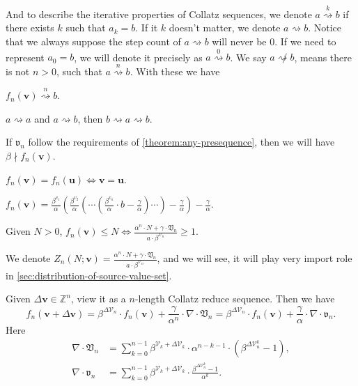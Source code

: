 And to describe the iterative properties of Collatz sequences, we denote $a \overset{k}{\rightsquigarrow} b$ if there exists $k$ such that $a_k = b$.
If it $k$ doesn't matter, we denote $a \rightsquigarrow b$. Notice that we always suppose the step count of $a \rightsquigarrow b$ will never be $0$. If we need to represent $a_0 = b$, we will denote it precisely as $a \overset{0}{\rightsquigarrow} b$. We say $a \not\rightsquigarrow b$, means there is not $n > 0$, such that $a \overset{n}{\rightsquigarrow} b$.
With these we have
\begin{proposition}
    $f_{n}(\bm{v}) \overset{n}{\rightsquigarrow} b$.
\end{proposition}
\begin{proposition}
    $a\rightsquigarrow a$ and $a \rightsquigarrow b$, then $b \rightsquigarrow a \rightsquigarrow b$.
\end{proposition}
\begin{proposition}
    If $\mathfrak{v}_{n}$ follow the requirements of \cref{theorem:any-presequence}, then we will have $\beta \nmid f_{n}(\bm{v})$.
\end{proposition}
\begin{proposition}
    $f_{n}(\bm{v}) = f_{n}(\bm{u}) \Longleftrightarrow \bm{v} = \bm{u}$.
\end{proposition}
\begin{proposition}
    $f_{n}(\bm{v}) = \frac{\beta^{v_{1}}}{\alpha}\left(\frac{\beta^{v_{2}}}{\alpha}\left(\cdots \left(\frac{\beta^{v_{n}}}{\alpha}\cdot b - \frac{\gamma}{\alpha}\right)\cdots\right)- \frac{\gamma}{\alpha}\right) - \frac{\gamma}{\alpha}$.
\end{proposition}
\begin{proposition}\label{prop:condition-of-source-value-le-N}
    Given $N > 0$, $f_{n}(\bm{v}) \le N \Longleftrightarrow \frac{\alpha^{n}\cdot N + \gamma\cdot\mathfrak{V}_{n}}{a\cdot \beta^{\mathcal{V}_{n}}} \ge 1$.
\end{proposition}
We denote $Z_{n}(N;\bm{v}) = \frac{\alpha^{n}\cdot N + \gamma\cdot\mathfrak{V}_{n}}{a\cdot \beta^{\mathcal{V}_{n}}}$, and we will see, it will play very import role in \cref{sec:distribution-of-source-value-set}.
\begin{theorem}\label{thm:vary-rule}
Given $\Delta\bm{v} \in \mathbb{Z}^{n}$, view it as a $n$-length Collatz reduce sequence. Then we have
\[ f_{n}(\bm{v} + \Delta\bm{v}) = \beta^{\Delta\mathcal{V}_{n}}\cdot f_{n}(\bm{v}) + \frac{\gamma}{\alpha^{n}} \cdot \nabla\cdot\mathfrak{V}_{n} = \beta^{\Delta\mathcal{V}_{n}}\cdot f_{n}(\bm{v}) + \frac{\gamma}{\alpha} \cdot \nabla\cdot\mathfrak{v}_{n}. \]
Here
\begin{align*}
    \nabla\cdot\mathfrak{V}_{n} &= \sum_{k=0}^{n-1}\beta^{\mathcal{V}_{k} + \Delta\mathcal{V}_{k}}\cdot\alpha^{n-k-1}\cdot(\beta^{\Delta\mathcal{V}_{n}^{k}} - 1),\\
    \nabla\cdot\mathfrak{v}_{n} &= \sum_{k=0}^{n-1}\beta^{\mathcal{V}_{k} + \Delta\mathcal{V}_{k}}\cdot\frac{\beta^{\Delta\mathcal{V}_{n}^{k}} - 1}{\alpha^{k}}.
\end{align*}
\end{theorem}
